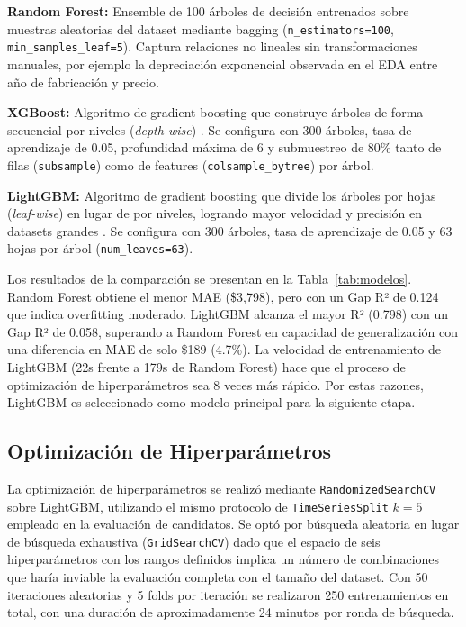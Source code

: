 \documentclass[conference]{IEEEtran}
\begin{document}
\textbf{Random Forest:} Ensemble de 100 árboles de decisión entrenados sobre muestras aleatorias del dataset mediante bagging (\texttt{n\_estimators=100}, \texttt{min\_samples\_leaf=5}). Captura relaciones no lineales sin transformaciones manuales, por ejemplo la depreciación exponencial observada en el EDA entre año de fabricación y precio.

\textbf{XGBoost:} Algoritmo de gradient boosting que construye árboles de forma secuencial por niveles (\textit{depth-wise}) \cite{chen2016}. Se configura con 300 árboles, tasa de aprendizaje de 0.05, profundidad máxima de 6 y submuestreo de 80\% tanto de filas (\texttt{subsample}) como de features (\texttt{colsample\_bytree}) por árbol.

\textbf{LightGBM:} Algoritmo de gradient boosting que divide los árboles por hojas (\textit{leaf-wise}) en lugar de por niveles, logrando mayor velocidad y precisión en datasets grandes \cite{ke2017}. Se configura con 300 árboles, tasa de aprendizaje de 0.05 y 63 hojas por árbol (\texttt{num\_leaves=63}).

Los resultados de la comparación se presentan en la Tabla~\ref{tab:modelos}. Random Forest obtiene el menor MAE (\$3{,}798), pero con un Gap R² de 0.124 que indica overfitting moderado. LightGBM alcanza el mayor R² (0.798) con un Gap R² de 0.058, superando a Random Forest en capacidad de generalización con una diferencia en MAE de solo \$189 (4.7\%). La velocidad de entrenamiento de LightGBM (22s frente a 179s de Random Forest) hace que el proceso de optimización de hiperparámetros sea 8 veces más rápido. Por estas razones, LightGBM es seleccionado como modelo principal para la siguiente etapa.

\subsection{Optimización de Hiperparámetros}
\label{subsec:hypertuning}

La optimización de hiperparámetros se realizó mediante \texttt{RandomizedSearchCV} sobre LightGBM, utilizando el mismo protocolo de \texttt{TimeSeriesSplit} $k{=}5$ empleado en la evaluación de candidatos. Se optó por búsqueda aleatoria en lugar de búsqueda exhaustiva (\texttt{GridSearchCV}) dado que el espacio de seis hiperparámetros con los rangos definidos implica un número de combinaciones que haría inviable la evaluación completa con el tamaño del dataset. Con 50 iteraciones aleatorias y 5 folds por iteración se realizaron 250 entrenamientos en total, con una duración de aproximadamente 24 minutos por ronda de búsqueda.
\end{document}
